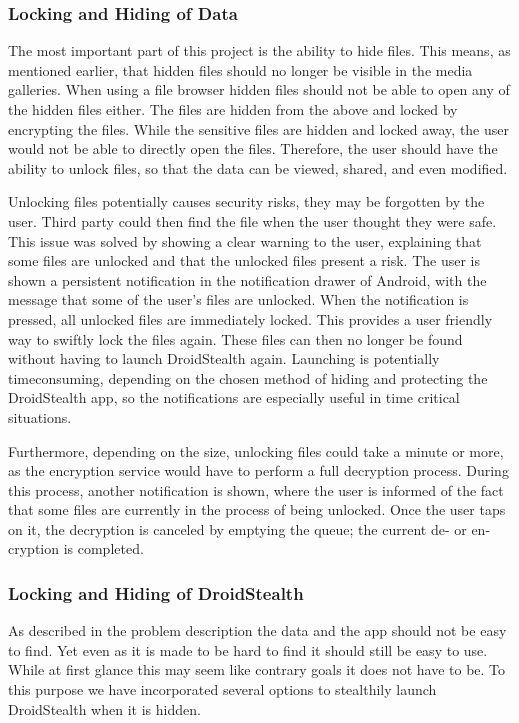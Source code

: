 \subsubsection{Locking and Hiding of Data}

The most important part of this project is the ability to hide
files. This means, as mentioned earlier, that hidden
files should no longer be visible in the media
galleries. When using a file browser hidden files should not be
able to open any of the hidden files either.
The files are hidden from the above and locked by encrypting the files.
While the sensitive files are hidden and locked away, the user would not be able to
directly open the files. Therefore, the user should have the
ability to unlock files, so that the data can be viewed,
shared, and even modified.

Unlocking files potentially causes security risks, they may be
forgotten by the user. Third party could then find the file when the user thought they were safe.
This issue was solved by showing
a clear warning to the user, explaining that some files are
unlocked and that the unlocked files present a risk.
The user is shown a persistent notification in the
notification drawer of Android, with the message that some of
the user's files are unlocked. When the notification is pressed,
all unlocked files are immediately locked. This
provides a user friendly way to swiftly lock the files again. These files
can then no longer be found without having to launch DroidStealth again. Launching
is potentially timeconsuming, depending on the chosen method of
hiding and protecting the DroidStealth app, so the notifications are especially useful in time critical situations.

Furthermore, depending on the size, unlocking files could take a
minute or more, as the encryption service would have to perform a
full decryption process. During this process, another notification 
is shown, where the user is informed
of the fact that some files are currently in the process of
being unlocked. Once the user taps on it, the decryption is
canceled by emptying the queue; the current de- or en-cryption is completed.


\subsubsection{Locking and Hiding of DroidStealth}

As described in the problem description the data and the app should not be easy to find.
Yet even as it is made to be hard to find it should still be easy to use.
While at first glance this may seem like contrary goals it does not have to be.
To this purpose we have incorporated several options to stealthily launch DroidStealth when it is hidden.

